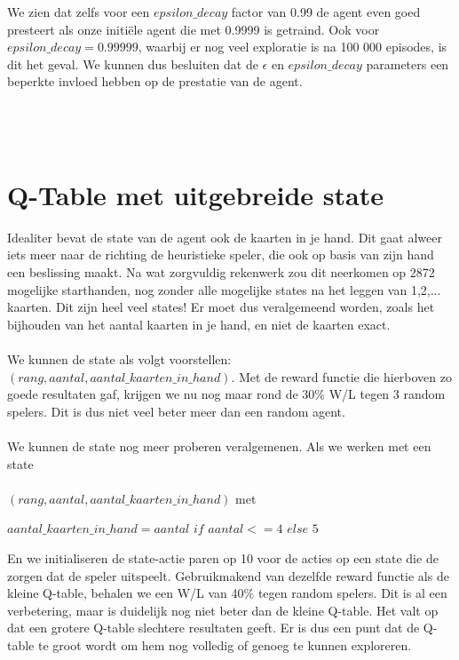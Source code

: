 \documentclass[11pt]{article}
\begin{document}
\noindent We zien dat zelfs voor een $epsilon\_decay$ factor van 0.99 de agent even goed presteert als onze initiële agent die met 0.9999 is getraind. Ook voor $epsilon\_decay = 0.99999$, waarbij er nog veel exploratie is na 100 000 episodes, is dit het geval. We kunnen dus besluiten dat de $\epsilon$ en $epsilon\_decay$ parameters een beperkte invloed hebben op de prestatie van de agent.\\\\

\section{\\Q-Table met uitgebreide state}
\label{appendix:extended_state}
Idealiter bevat de state van de agent ook de kaarten in je hand. Dit gaat alweer iets meer naar de richting de heuristieke speler, die ook op basis van zijn hand een beslissing maakt. Na wat zorgvuldig rekenwerk zou dit neerkomen op 2872 mogelijke starthanden, nog zonder alle mogelijke states na het leggen van 1,2,... kaarten. Dit zijn heel veel states! Er moet dus veralgemeend worden, zoals het bijhouden van het aantal kaarten in je hand, en niet de kaarten exact.\\\\
We kunnen de state als volgt voorstellen: $(rang, aantal, aantal\_kaarten\_in\_hand)$. Met de reward functie die hierboven zo goede resultaten gaf, krijgen we nu nog maar rond de 30\% W/L tegen 3 random spelers. Dit is dus niet veel beter meer dan een random agent.\\\\
We kunnen de state nog meer proberen veralgemenen. Als we werken met een state\\\\
\indent $(rang, aantal, aantal\_kaarten\_in\_hand)$ met
\begin{center}
$aantal\_kaarten\_in\_hand = aantal$ $if$ $ aantal <= 4$ $else$ $5$
\end{center}
En we initialiseren de state-actie paren op 10 voor de acties op een state die de zorgen dat de speler uitspeelt. Gebruikmakend van dezelfde reward functie als de kleine Q-table, behalen we een W/L van 40\% tegen random spelers. Dit is al een verbetering, maar is duidelijk nog niet beter dan de kleine Q-table. Het valt op dat een grotere Q-table slechtere resultaten geeft. Er is dus een punt dat de Q-table te groot wordt om hem nog volledig of genoeg te kunnen exploreren.\\\\
\end{document}
